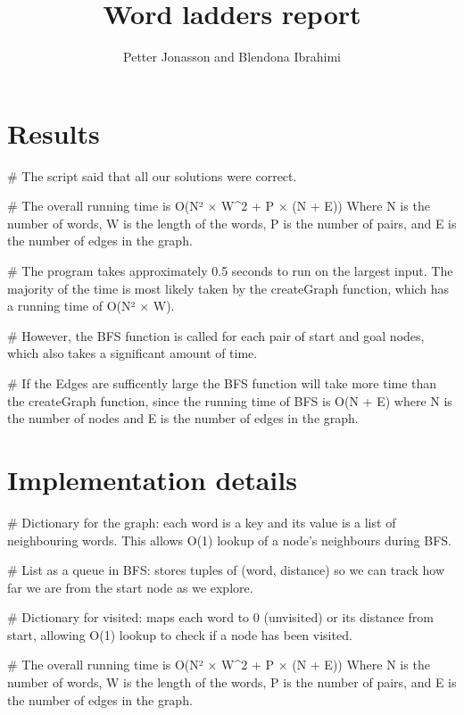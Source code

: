 \documentclass{article}
\title{Word ladders report}
\author{Petter Jonasson and Blendona Ibrahimi}
\begin{document}
  \maketitle

  \section{Results}

  # The script said that all our solutions were correct. 

  # The overall running time is O(N² × W^2 + P × (N + E)) Where N is the number of words, W is the length of the words, P is the number of pairs, and E is the number of edges in the graph.

  # The program takes approximately 0.5 seconds to run on the largest input. The majority of the time is most likely taken by the createGraph function, which has a running time of O(N² × W).
  
  # However, the BFS function is called for each pair of start and goal nodes, which also takes a significant amount of time. 
  
  # If the Edges are sufficently large the BFS function will take more time than the createGraph function, since the running time of BFS is O(N + E) where N is the number of nodes and E is the number of edges in the graph.
  

  \section{Implementation details}

  
  # Dictionary for the graph: each word is a key and its value is a list of neighbouring words. This allows O(1) lookup of a node's neighbours during BFS.
  
  # List as a queue in BFS: stores tuples of (word, distance) so we can track how far we are from the start node as we explore.

  # Dictionary for visited: maps each word to 0 (unvisited) or its distance from start, allowing O(1) lookup to check if a node has been visited.

  # The overall running time is O(N² × W^2 + P × (N + E)) Where N is the number of words, W is the length of the words, P is the number of pairs, and E is the number of edges in the graph.
\end{document}
